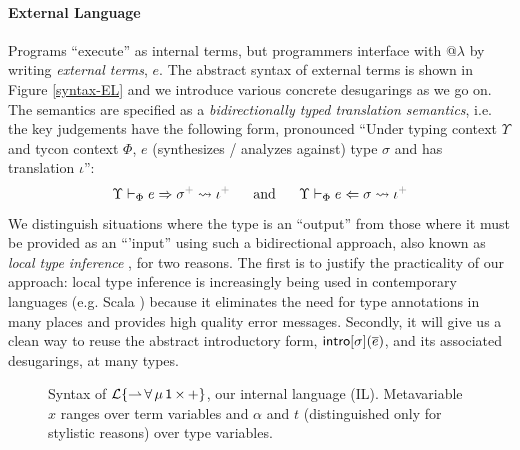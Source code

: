 \paragraph{External Language} Programs ``execute'' as internal terms, but programmers interface with @$\lambda$ by writing \emph{external terms}, $e$. The abstract syntax of external terms is shown in Figure \ref{syntax-EL} and we introduce various concrete desugarings as we go on. %
The semantics are specified as a \emph{bidirectionally typed translation semantics}, i.e. the key judgements have the following form, pronounced ``Under typing context $\Upsilon$ and tycon context $\Phi$, $e$ (synthesizes / analyzes against) type $\sigma$ and has  translation $\iota$'':\[\esynX{e}{\st\moutput}{\iota\moutput} ~~~~~\text{and}~~~~~ \eanaX{e}{\st}{\iota\moutput}\]
\noindent
We distinguish situations where the type is an ``output'' from those where it must be provided as an ``'input'' using such a bidirectional approach, also known as \emph{local type inference} \cite{Pierce:2000:LTI:345099.345100}, for two reasons. The first is to justify the practicality of our approach: local type inference is increasingly being used in contemporary languages (e.g. Scala \cite{OdeZenZen01}) because it eliminates the need for type annotations in many places and provides high quality error messages. %
Secondly, it will  give us a clean way to reuse the abstract introductory form, ${\sf intro}[\sigma](\overline{e})$, and its associated desugarings, at many types.%


\begin{figure}[t]
\small
\hspace{-5px}
\caption{Syntax of {$\mathcal{L}\{{\rightharpoonup}\,{\forall}\,{\mu}\,{{\sf 1}}\,{\times}\,{+}\}$}, our internal language (IL). Metavariable $x$ ranges over term variables and $\alpha$ and $t$ (distinguished only for stylistic reasons) over type variables.}
\label{syntax-IL}
\end{figure}

